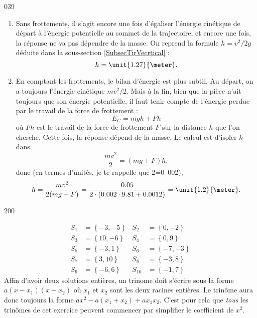 \documentclass{article}
\begin{document}
\begin{corrige}{039}

\begin{enumerate}

\item Sans frottements, il s'agit encore une fois d'égaliser l'énergie cinétique de départ à l'énergie potentielle au sommet de la trajectoire, et encore une fois, la réponse ne va pas dépendre de la masse. On reprend  la formule $h=v^2/2g$ déduite dans la sous-section \ref{SubsecTirVecrtical} :
\[ 
  h=\unit{1.27}{\meter}.
\]
 \item   En comptant les frottements, le bilan d'énergie est plus subtil. Au départ, on a toujours l'énergie cinétique $mv^2/2$. Mais à la fin, bien que la pièce n'ait toujours que son énergie potentielle, il faut tenir compte de l'énergie perdue par le travail de la force de frottement :
\[ 
  E_C=mgh+Fh
\]
où $Fh$ est le travail de la force de frottement $F$ sur la distance $h$ que l'on cherche. Cette fois, la réponse dépend de la masse. Le calcul est d'isoler $h$ dans
\[ 
  \frac{ mv^2 }{ 2 }=(mg+F)h,
\]
donc (en termes d'unités, je te rappelle que \unit{2}{\gram}=\unit{0.002}{\kilo\gram}),	
\[ 
  h=\frac{ mv^2 }{ 2(mg+F) }=\frac{ 0.05 }{ 2\cdot(0.002\cdot 9.81+0.0012) }=\unit{1.2}{\meter}.
\]
\end{enumerate}

\end{corrige}






  \begin{corrige}{200}

\begin{align*}
S_{1}&=\left\{-3,-5\right\}&S_{2}&=\left\{0,-2\right\}\\
S_{3}&=\left\{10,-6\right\}&S_{4}&=\left\{0,9\right\}\\
S_{5}&=\left\{-3,1\right\}&S_{6}&=\left\{-7,-3\right\}\\
S_{7}&=\left\{3,10\right\}&S_{8}&=\left\{-3,8\right\}\\
S_{9}&=\left\{-6,6\right\}&S_{10}&=\left\{-1,7\right\}
\end{align*}
 Affin d'avoir deux solutions entières, un trinome doit s'écrire sous la forme $a(x-x_1)(x-x_2)$ où $x_1$ et $x_2$ sont les deux racines entières. Le trinôme aura donc toujours la forme $ax^2-a(x_1+x_2)+ax_1x_2$. C'est pour cela que \emph{tous} les trinômes de cet exercice peuvent commencer par simplifier le coefficient de $x^2$.
\end{corrige}%
\end{document}
